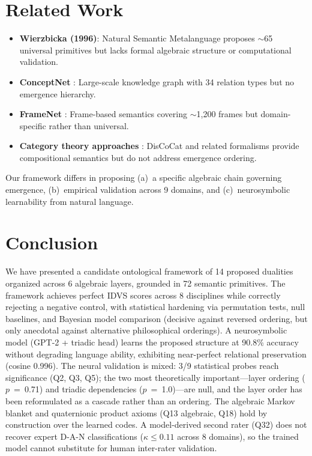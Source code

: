\documentclass[11pt, a4paper]{article}
\begin{document}
\section{Related Work}

\begin{itemize}[nosep, leftmargin=*]
    \item \textbf{Wierzbicka (1996)}: Natural Semantic Metalanguage proposes $\sim$65 universal primitives but lacks formal algebraic structure or computational validation.
    \item \textbf{ConceptNet} \citep{speer2017conceptnet}: Large-scale knowledge graph with 34 relation types but no emergence hierarchy.
    \item \textbf{FrameNet} \citep{baker1998framenet}: Frame-based semantics covering $\sim$1,200 frames but domain-specific rather than universal.
    \item \textbf{Category theory approaches} \citep{coecke2010mathematical}: DisCoCat and related formalisms provide compositional semantics but do not address emergence ordering.
\end{itemize}

Our framework differs in proposing (a)~a specific algebraic chain governing emergence, (b)~empirical validation across 9 domains, and (c)~neurosymbolic learnability from natural language.

\section{Conclusion}

We have presented a candidate ontological framework of 14 proposed dualities organized across 6 algebraic layers, grounded in 72 semantic primitives. The framework achieves perfect IDVS scores across 8 disciplines while correctly rejecting a negative control, with statistical hardening via permutation tests, null baselines, and Bayesian model comparison (decisive against reversed ordering, but only anecdotal against alternative philosophical orderings). A neurosymbolic model (GPT-2 + triadic head) learns the proposed structure at 90.8\% accuracy without degrading language ability, exhibiting near-perfect relational preservation (cosine 0.996). The neural validation is mixed: 3/9 statistical probes reach significance (Q2, Q3, Q5); the two most theoretically important---layer ordering ($p$~=~0.71) and triadic dependencies ($p$~=~1.0)---are null, and the layer order has been reformulated as a cascade rather than an ordering. The algebraic Markov blanket and quaternionic product axioms (Q13 algebraic, Q18) hold by construction over the learned codes. A model-derived second rater (Q32) does not recover expert D-A-N classifications ($\kappa \leq 0.11$ across 8 domains), so the trained model cannot substitute for human inter-rater validation.
\end{document}
